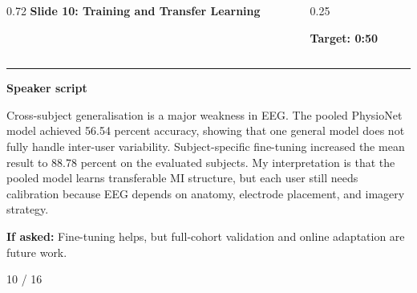 \documentclass[aspectratio=169,10pt]{beamer}
\begin{document}
\begin{frame}[plain]
\vspace*{0.16cm}
\begin{columns}[T,totalwidth=\textwidth]
\begin{column}{0.72\textwidth}
{\fontsize{17}{18.5}\selectfont\bfseries Slide 10: Training and Transfer Learning}
\end{column}
\begin{column}{0.25\textwidth}
\raggedleft
\colorbox{noteCream}{\parbox{0.88\linewidth}{\centering\bfseries Target: 0:50}}
\end{column}
\end{columns}
\vspace{0.10cm}
{\color{uomPurple}\rule{\textwidth}{1.2pt}}
\vspace{0.18cm}
{\color{uomPurple}\bfseries Speaker script}
\vspace{0.06cm}
\setlength{\fboxsep}{6pt}
\noindent\colorbox{panelGrey}{\begin{minipage}{0.94\textwidth}
\justifying\fontsize{11.0}{13.4}\selectfont
Cross-subject generalisation is a major weakness in EEG. The pooled PhysioNet model achieved 56.54 percent accuracy, showing that one general model does not fully handle inter-user variability. Subject-specific fine-tuning increased the mean result to 88.78 percent on the evaluated subjects. My interpretation is that the pooled model learns transferable MI structure, but each user still needs calibration because EEG depends on anatomy, electrode placement, and imagery strategy.
\end{minipage}}
\vspace{0.22cm}
\noindent\colorbox{noteCream}{\begin{minipage}{0.94\textwidth}
\fontsize{9.6}{11.6}\selectfont
{\bfseries If asked:} Fine-tuning helps, but full-cohort validation and online adaptation are future work.
\end{minipage}}
\vfill
\hfill{\color{textDark}\scriptsize 10 / 16}
\end{frame}
\end{document}
